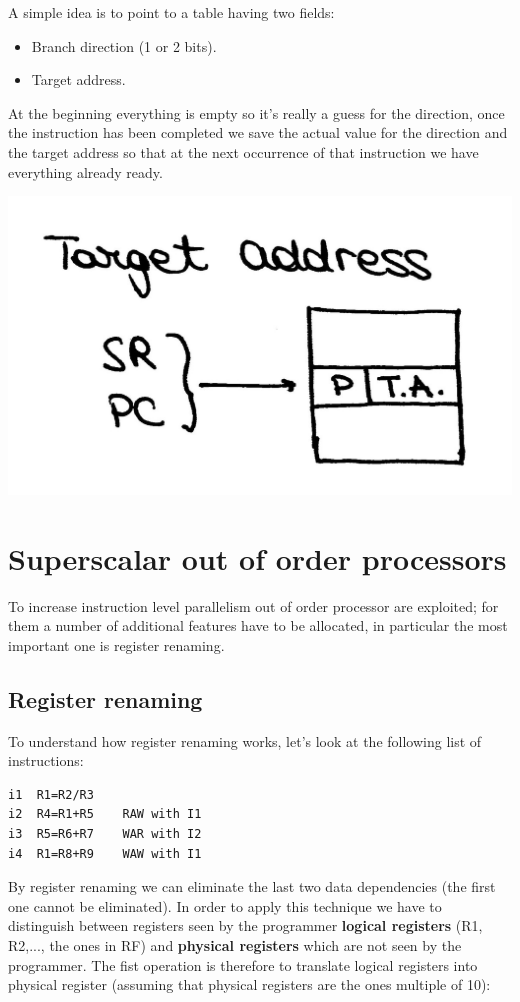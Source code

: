 A simple idea is to point to a table having two fields:
\begin{itemize}
  \item Branch direction (1 or 2 bits).
  \item Target address.
\end{itemize}

At the beginning everything is empty so it's really a guess for the direction, once the instruction has been completed we save the actual value for the direction and the target address so that at the next occurrence of that instruction we have everything already ready.
\begin{center}
  \includegraphics[width=0.5\linewidth]{img/img3/25}
\end{center}

\section{Superscalar out of order processors}
To increase instruction level parallelism out of order processor are exploited; for them a number of additional features have to be allocated, in particular the most important one is register renaming.

\subsection{Register renaming}
To understand how register renaming works, let's look at the following list of instructions:
\begin{verbatim}
i1  R1=R2/R3
i2  R4=R1+R5    RAW with I1
i3  R5=R6+R7    WAR with I2
i4  R1=R8+R9    WAW with I1
\end{verbatim}

By register renaming we can eliminate the last two data dependencies (the first one cannot be eliminated). In order to apply this technique we have to distinguish between registers seen by the programmer \textbf{logical registers} (R1, R2,..., the ones in RF) and \textbf{physical registers} which are not seen by the programmer. The fist operation is therefore to translate logical registers into physical register (assuming that physical registers are the ones multiple of 10):

